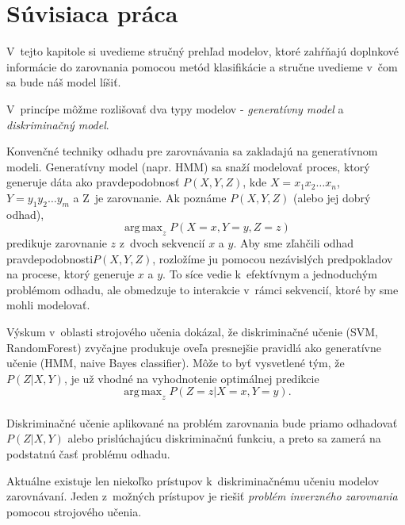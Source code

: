 \chapter{Súvisiaca práca}
\label{chap:other-work}

V~tejto kapitole si uvedieme stručný prehľad modelov, ktoré zahŕňajú doplnkové informácie do zarovnania pomocou metód klasifikácie a stručne uvedieme v~čom sa bude náš model líšiť.

V~princípe môžme rozlišovať dva typy modelov - \textit{generatívny model} a \textit{diskriminačný model}.

Konvenčné techniky odhadu pre zarovnávania sa zakladajú na generatívnom modeli. Generatívny model (napr. HMM) sa snaží modelovať proces, ktorý generuje dáta ako pravdepodobnosť $P(X,Y,Z)$, kde $X = x_1x_2\dots x_n$, $Y = y_1y_2\dots y_m$ a Z~je zarovnanie. Ak poznáme $P(X,Y,Z)$ (alebo jej dobrý odhad),
$$\operatorname{ arg\,max}_z P(X = x,Y = y,Z = z)$$
predikuje zarovnanie $z$ z~dvoch sekvencií $x$ a $y$. Aby sme zľahčili odhad pravdepodobnosti$P(X,Y,Z)$, rozložíme ju pomocou nezávislých predpokladov na procese, ktorý generuje $x$ a $y$. To síce vedie k~efektívnym a jednoduchým problémom odhadu, ale obmedzuje to interakcie v~rámci sekvencií, ktoré by sme mohli modelovať. \cite{svmTrainingProteinsAlignment}

Výskum v~oblasti strojového učenia dokázal, že diskriminačné učenie (SVM, RandomForest) zvyčajne produkuje oveľa presnejšie pravidlá ako generatívne učenie (HMM, naive Bayes classifier). \cite{svmTrainingProteinsAlignment}
Môže to byť vysvetlené tým, že $P(Z|X,Y)$, je už vhodné na vyhodnotenie optimálnej predikcie
$$\operatorname{ arg\,max}_z P(Z = z|X = x,Y = y).$$
\cite{svmTrainingProteinsAlignment}\\
Diskriminačné učenie aplikované na problém zarovnania bude priamo odhadovať $P(Z|X,Y)$ alebo prislúchajúcu diskriminačnú funkciu, a preto sa zamerá na podstatnú časť problému odhadu. \cite{svmTrainingProteinsAlignment}

Aktuálne existuje len niekoľko prístupov k~diskriminačnému učeniu modelov zarovnávaní.
Jeden z~možných prístupov je riešiť \textit{problém inverzného zarovnania} pomocou strojového učenia. \cite{svmTrainingProteinsAlignment}

